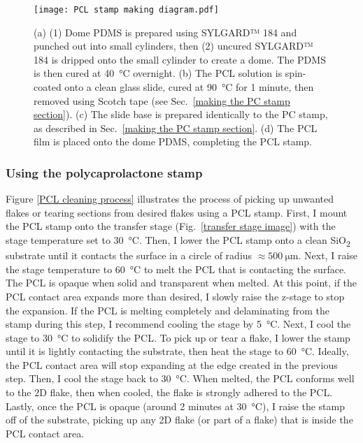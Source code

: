 \documentclass[double,12pt,1in,seploa]{beavtex}
\let\Oldsubsubsection\subsubsection
\renewcommand{\subsubsection}{\FloatBarrier\Oldsubsubsection}
\begin{document}
\begin{figure}
    \texttt{[image: PCL stamp making diagram.pdf]}
    \caption{(a) (1) Dome PDMS is prepared using SYLGARD™ 184 and punched out into small cylinders, then (2) uncured SYLGARD™ 184 is dripped onto the small cylinder to create a dome. The PDMS is then cured at \SI{40}{\celsius} overnight. (b) The PCL solution is spin-coated onto a clean glass slide, cured at \SI{90}{\celsius} for 1 minute, then removed using Scotch tape (see Sec.\ \ref{making the PC stamp section}). (c) The slide base is prepared identically to the PC stamp, as described in Sec.\ \ref{making the PC stamp section}. (d) The PCL film is placed onto the dome PDMS, completing the PCL stamp.}
    \label{PCL stamp making diagram}
\end{figure}

\subsubsection{Using the polycaprolactone stamp}
Figure \ref{PCL cleaning process} illustrates the process of picking up unwanted flakes or tearing sections from desired flakes using a PCL stamp. First, I mount the PCL stamp onto the transfer stage (Fig.\ \ref{transfer stage image}) with the stage temperature set to \SI{30}{\celsius}. Then, I lower the PCL stamp onto a clean SiO\textsubscript{2} substrate until it contacts the surface in a circle of radius $\approx \SI{500}{\micro\meter}$. Next, I raise the stage temperature to \SI{60}{\celsius} to melt the PCL that is contacting the surface. The PCL is opaque when solid and transparent when melted. At this point, if the PCL contact area expands more than desired, I slowly raise the z-stage to stop the expansion. If the PCL is melting completely and delaminating from the stamp during this step, I recommend cooling the stage by \SI{5}{\celsius}. Next, I cool the stage to \SI{30}{\celsius} to solidify the PCL. To pick up or tear a flake, I lower the stamp until it is lightly contacting the substrate, then heat the stage to \SI{60}{\celsius}. Ideally, the PCL contact area will stop expanding at the edge created in the previous step. Then, I cool the stage back to \SI{30}{\celsius}. When melted, the PCL conforms well to the 2D flake, then when cooled, the flake is strongly adhered to the PCL. Lastly, once the PCL is opaque (around 2 minutes at \SI{30}{\celsius}), I raise the stamp off of the substrate, picking up any 2D flake (or part of a flake) that is inside the PCL contact area.
\end{document}
